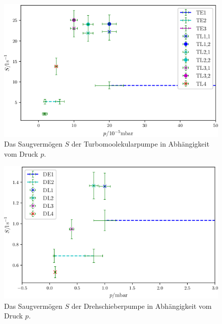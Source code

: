 \begin{figure}
\centering
\includegraphics[width=\linewidth-70pt,height=\textheight-70pt,keepaspectratio]{content/images/TGes.png}
\caption{Das Saugvermögen $S$ der Turbomoolekularpumpe in Abhängigkeit vom Druck $p$.}
\label{fig:TGes}
\end{figure}

\begin{figure}
\centering
\includegraphics[width=\linewidth-70pt,height=\textheight-70pt,keepaspectratio]{content/images/DGes.png}
\caption{Das Saugvermögen $S$ der Drehschieberpumpe in Abhängigkeit vom Druck $p$.}
\label{fig:DGes}
\end{figure}